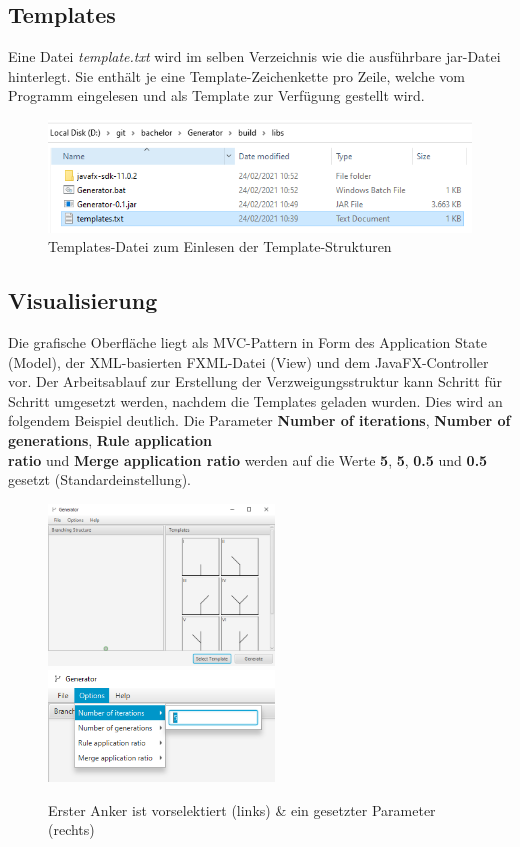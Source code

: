 \subsection*{Templates}
Eine Datei \textit{template.txt} wird im selben Verzeichnis wie die ausführbare jar-Datei hinterlegt.
Sie enthält je eine Template-Zeichenkette pro Zeile, welche vom Programm eingelesen und als Template
zur Verfügung gestellt wird.
\begin{figure}[H]
    \centering
    \includegraphics[width=12cm]{../images/templates_file.png}
    \caption{Templates-Datei zum Einlesen der Template-Strukturen}
\end{figure}

\newpage

\subsection*{Visualisierung}
Die grafische Oberfläche liegt als MVC-Pattern in Form des Application State (Model), der XML-basierten FXML-Datei (View)
und dem JavaFX-Controller vor.
Der Arbeitsablauf zur Erstellung der Verzweigungsstruktur kann Schritt für Schritt umgesetzt werden, nachdem die Templates
geladen wurden.
Dies wird an folgendem Beispiel deutlich.
Die Parameter \textbf{Number of iterations}, \textbf{Number of generations}, \textbf{Rule application\\ratio} und
\textbf{Merge application ratio} werden auf die Werte \textbf{5}, \textbf{5}, \textbf{0.5} und \textbf{0.5} gesetzt
(Standardeinstellung).
\begin{figure}[H]
    \centering
    \includegraphics[width=6cm]{../images/UI_templates.png}
    \includegraphics[width=6cm]{../images/UI_parameters.png}
    \caption{Erster Anker ist vorselektiert (links) \& ein gesetzter Parameter (rechts)}
\end{figure}

